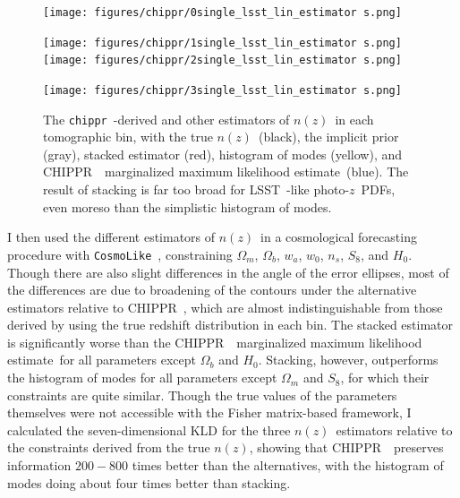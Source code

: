 \documentclass[iop]{emulateapj}
\newcommand{\project}[1]{{\textsc{#1}}~}
\newcommand{\lsst}{\project{LSST}}
\newcommand{\Chippr}{\project{CHIPPR}}
\newcommand{\repo}[1]{{\texttt{#1}}~}
\newcommand{\chippr}{\repo{chippr}}
\newcommand{\cosmolike}{\repo{CosmoLike}}
\newcommand{\nz}{$n(z)$}
\newcommand{\pz}{photo-$z$~}
\newcommand{\pzpdf}{\pz PDF}
\newcommand{\mmle}{marginalized maximum likelihood estimate}
\begin{document}
\begin{figure}
	\begin{center}
		
\texttt{[image: figures/chippr/0single\_lsst\_lin\_estimator
s.png]}
		
\texttt{[image: figures/chippr/1single\_lsst\_lin\_estimator
s.png]}		
\texttt{[image: figures/chippr/2single\_lsst\_lin\_estimator
s.png]}
		
\texttt{[image: figures/chippr/3single\_lsst\_lin\_estimator
s.png]}
		\caption{
			The \chippr-derived and other estimators of \nz\ in 
each tomographic bin, with the true \nz\ (black), the implicit prior (gray), 
stacked estimator (red), histogram of modes (yellow), and \Chippr\ \mmle\ 
(blue).
			The result of stacking is far too broad for \lsst-like 
\pzpdf s, even moreso than the simplistic histogram of modes.
		}
		\label{fig:per-bin-ests}
	\end{center}
\end{figure}

I then used the different estimators of \nz\ in a cosmological forecasting 
procedure with \cosmolike, constraining $\Omega_{m}$, $\Omega_{b}$, $w_{a}$, 
$w_{0}$, $n_{s}$, $S_{8}$, and $H_{0}$.
Though there are also slight differences in the angle of the error ellipses, 
most of the differences are due to broadening of the contours under the 
alternative estimators relative to \Chippr, which are almost indistinguishable 
from those derived by using the true redshift distribution in each bin.
The stacked estimator is significantly worse than the \Chippr\ \mmle\ for all 
parameters except $\Omega_{b}$ and $H_{0}$.
Stacking, however, outperforms the histogram of modes for all parameters except 
$\Omega_{m}$ and $S_{8}$, for which their constraints are quite similar.
Though the true values of the parameters themselves were not accessible with 
the Fisher matrix-based framework, I calculated the seven-dimensional KLD for 
the three \nz\ estimators relative to the constraints derived from the true 
\nz, showing that \Chippr\ preserves information $200-800$ times better than 
the alternatives, with the histogram of modes doing about four times better 
than stacking.
\end{document}
